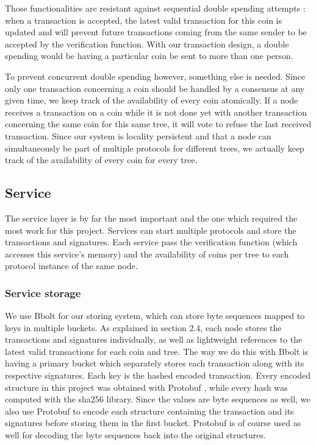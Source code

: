 \documentclass[11pt, a4paper, twoside, openright]{article}
\begin{document}
Those functionalities are resistant against sequential double spending attempts : when a transaction is accepted, the latest valid transaction for this coin is updated and will prevent future transactions coming from the same sender to be accepted by the verification function. With our transaction design, a double spending would be having a particular coin be sent to more than one person.

To prevent concurrent double spending however, something else is needed. Since only one transaction concerning a coin should be handled by a consensus at any given time, we keep track of the availability of every coin atomically. If a node receives a transaction on a coin while it is not done yet with another transaction concerning the same coin for this same tree, it will vote to refuse the last received transaction. Since our system is locality persistent and that a node can simultaneously be part of multiple protocols for different trees, we actually keep track of the availability of every coin for every tree.

\subsection{Service}

The service layer is by far the most important and the one which required the most work for this project. 
Services can start multiple protocols and store the transactions and signatures. Each service pass the verification function (which accesses this service's memory) and the availability of coins per tree to each protocol instance of the same node.

\subsubsection{Service storage}

We use Bbolt \cite{bbolt} for our storing system, which can store byte sequences mapped to keys in multiple buckets. As explained in section 2.4, each node stores the transactions and signatures individually, as well as lightweight references to the latest valid transactions for each coin and tree. The way we do this with Bbolt is having a primary bucket which separately stores each transaction along with its respective signatures. Each key is the hashed encoded transaction. Every encoded structure in this project was obtained with Protobuf \cite{protobuf}, while every hash was computed with the sha256 library. Since the values are byte sequences as well, we also use Protobuf to encode each structure containing the transaction and its signatures before storing them in the first bucket. Protobuf is of course used as well for decoding the byte sequences back into the original structures.
\end{document}
